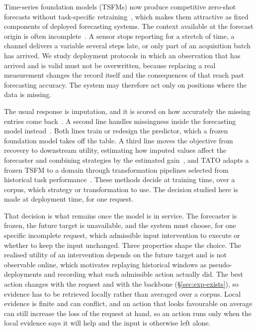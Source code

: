 \documentclass{article}
\newcommand{\tsfm}{TSFM}
\begin{document}
Time-series foundation models (\tsfm{}s) now produce competitive zero-shot forecasts without
task-specific retraining~\citep{ansari2024chronos,chronosbolt2025,das2024timesfm,woo2024moirai,
chronos2_2025}, which makes them attractive as fixed components of deployed forecasting
systems. The context available at the forecast origin is often
incomplete~\citep{chen2024bitgraph,peng2025s4m}. A sensor stops reporting for a stretch of
time, a channel delivers a variable several steps late, or only part of an acquisition batch
has arrived. We study deployment protocols in which an observation that has arrived and is
valid must not be overwritten, because replacing a real measurement changes the record itself
and the consequences of that reach past forecasting accuracy. The system may therefore act
only on positions where the data is missing.

The usual response is imputation, and it is scored on how accurately the missing entries come
back~\citep{cao2018brits,tashiro2021csdi,du2023saits}. A second line handles missingness inside
the forecasting model instead~\citep{chen2024bitgraph,peng2025s4m}. Both lines train or
redesign the predictor, which a frozen foundation model takes off the table. A third
line moves the objective from recovery to downstream utility, estimating how imputed values
affect the forecaster and combining strategies by the estimated
gain~\citep{wang2024taskoriented,hao2025toivsf,xu2026srdi}, and TATO adapts a frozen \tsfm{} to
a domain through transformation pipelines selected from historical task
performance~\citep{qiu2026tato}. These methods decide at training time, over a corpus, which
strategy or transformation to use. The decision studied here is made at deployment time, for
one request.

That decision is what remains once the model is in service. The forecaster is frozen, the
future target is unavailable, and the system must choose, for one specific incomplete request,
which admissible input intervention to execute or whether to keep the input unchanged. Three
properties shape the choice. The realised utility of an intervention depends on the future
target and is not observable online, which motivates replaying historical windows as
pseudo-deployments and recording what each admissible action actually did. The best action
changes with the request and with the backbone (\S\ref{sec:exp-exists}), so evidence has to be
retrieved locally rather than averaged over a corpus. Local evidence is finite and can
conflict, and an action that looks favourable on average can still increase the loss of the
request at hand, so an action runs only when the local evidence says it will help and the
input is otherwise left alone.
\end{document}
